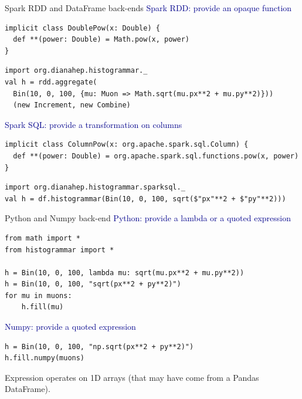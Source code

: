 \documentclass[aspectratio=169]{beamer}
\begin{document}
\begin{frame}[fragile]{Spark RDD and DataFrame back-ends}
\vspace{0.5 cm}
\textcolor{darkblue}{\large Spark RDD: provide an opaque function}

\begin{lstlisting}[basicstyle=\ttfamily\scriptsize\color{gray}]
implicit class DoublePow(x: Double) {
  def **(power: Double) = Math.pow(x, power)
}
\end{lstlisting}

\vspace{-0.25 cm}
\small
\begin{verbatim}
import org.dianahep.histogrammar._
val h = rdd.aggregate(
  Bin(10, 0, 100, {mu: Muon => Math.sqrt(mu.px**2 + mu.py**2)}))
  (new Increment, new Combine)
\end{verbatim}

\vspace{0.5 cm}
\textcolor{darkblue}{\large Spark SQL: provide a transformation on columns}

\begin{lstlisting}[basicstyle=\ttfamily\scriptsize\color{gray}]
implicit class ColumnPow(x: org.apache.spark.sql.Column) {
  def **(power: Double) = org.apache.spark.sql.functions.pow(x, power)
}
\end{lstlisting}

\vspace{-0.25 cm}
\small
\begin{verbatim}
import org.dianahep.histogrammar.sparksql._
val h = df.histogrammar(Bin(10, 0, 100, sqrt($"px"**2 + $"py"**2)))
\end{verbatim}
\end{frame}

\begin{frame}[fragile]{Python and Numpy back-end}
\vspace{0.5 cm}
\textcolor{darkblue}{\large Python: provide a lambda or a quoted expression}

\begin{verbatim}
from math import *
from histogrammar import *

h = Bin(10, 0, 100, lambda mu: sqrt(mu.px**2 + mu.py**2))
h = Bin(10, 0, 100, "sqrt(px**2 + py**2)")
for mu in muons:
    h.fill(mu)
\end{verbatim}

\vspace{0.25 cm}
\textcolor{darkblue}{\large Numpy: provide a quoted expression}

\begin{verbatim}
h = Bin(10, 0, 100, "np.sqrt(px**2 + py**2)")
h.fill.numpy(muons)
\end{verbatim}

Expression operates on 1D arrays (that may have come from a Pandas DataFrame).

\vspace{0.25 cm}
\vspace{0.25 cm}
\end{frame}
\end{document}

